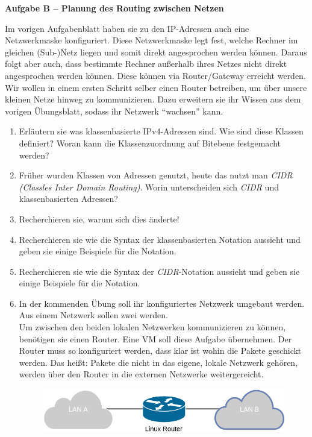 \documentclass[paper=a4,fontsize=11pt]{scrartcl}%
\numberwithin{equation}{section}
\begin{document}
\begin{center}
\Large{\textbf{Aufgabe B -- Planung des Routing zwischen Netzen}}
\end{center}
\vskip0.25in
Im vorigen Aufgabenblatt haben sie zu den IP-Adressen auch eine Netzwerkmaske konfiguriert. Diese Netzwerkmaske legt fest, welche Rechner im gleichen (Sub-)Netz liegen und somit direkt angesprochen werden können. Daraus folgt aber auch, dass bestimmte Rechner außerhalb ihres Netzes nicht direkt angesprochen werden können. Diese können via Router/Gateway erreicht werden.\\
Wir wollen in einem ersten Schritt selber einen Router betreiben, um über unsere kleinen Netze hinweg zu kommunizieren. Dazu erweitern sie ihr Wissen aus dem vorigen Übungsblatt, sodass ihr Netzwerk \enquote{wachsen} kann.
\begin{enumerate}
	\item Erläutern sie was klassenbasierte IPv4-Adressen sind. Wie sind diese Klassen definiert? Woran kann die Klassenzuordnung auf Bitebene festgemacht werden?
	\item Früher wurden Klassen von Adressen genutzt, heute das nutzt man \emph{CIDR (Classles Inter Domain Routing)}. Worin unterscheiden sich \emph{CIDR} und klassenbasierten Adressen?
	\item Recherchieren sie, warum sich dies änderte!
	\item Recherchieren sie wie die Syntax der klassenbasierten Notation aussieht und geben sie einige Beispiele für die Notation.
	\item Recherchieren sie wie die Syntax der \emph{CIDR}-Notation aussieht und geben sie einige Beispiele für die Notation.
	\item In der kommenden Übung soll ihr konfiguriertes Netzwerk umgebaut werden. Aus einem Netzwerk sollen zwei werden.\\
	Um zwischen den beiden lokalen Netzwerken kommunizieren zu können, benötigen sie einen Router. Eine VM soll diese Aufgabe übernehmen. Der Router muss so konfiguriert werden, dass klar ist wohin die Pakete geschickt werden. Das heißt: Pakete die nicht in das eigene, lokale Netzwerk gehören, werden über den Router in die externen Netzwerke weitergereicht.
	\begin{figure}[h]
	\centering
	\includegraphics[scale=0.35]{lan}

\end{figure}
\end{enumerate}
\end{document}
